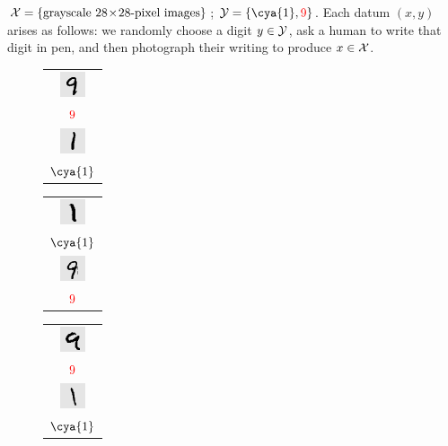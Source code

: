 

        $\mathcal{X} = \{\text{grayscale~}28\!\times\!28\text{-pixel images}\}$;
        $\yY=\{{\cya{1}},{\red{9}}\}$.  Each datum $(x,y)$ arises as follows:
        we randomly choose a digit $y\in \mathcal{Y}$, ask a human to write that digit
        in pen, and then photograph their writing to produce $x\in\mathcal{X}$.
        \vspace{-0.25cm}
        \begin{figure}
            \centering
          \begin{tabular}{c}\includegraphics[width=0.75cm]{example-mnist/mnist-trn-00}\\$\red{9}$\\\includegraphics[width=0.75cm]{example-mnist/mnist-trn-10}\\$\cya{1}$\end{tabular}%
          \begin{tabular}{c}\includegraphics[width=0.75cm]{example-mnist/mnist-trn-01}\\$\cya{1}$\\\includegraphics[width=0.75cm]{example-mnist/mnist-trn-11}\\$\red{9}$\end{tabular}%
          \begin{tabular}{c}\includegraphics[width=0.75cm]{example-mnist/mnist-trn-02}\\$\red{9}$\\\includegraphics[width=0.75cm]{example-mnist/mnist-trn-12}\\$\cya{1}$\end{tabular}%

\end{figure}
